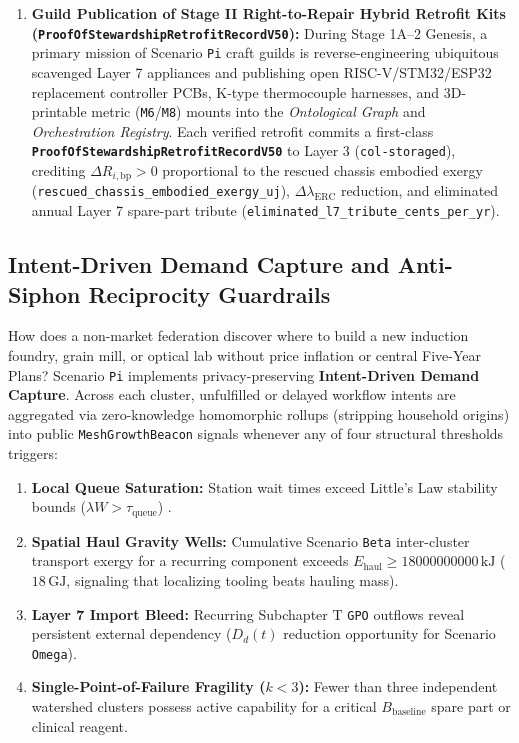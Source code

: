 \begin{enumerate}
\begin{equation}
\begin{aligned}
    \end{aligned}
        \label{eq:pi-antifarm}
    \end{equation}
    \item \textbf{Guild Publication of Stage II Right-to-Repair Hybrid Retrofit Kits (\texttt{ProofOfStewardshipRetrofitRecordV50}):}
    During Stage 1A--2 Genesis, a primary mission of Scenario \texttt{Pi} craft guilds is reverse-engineering
    ubiquitous scavenged Layer 7 appliances and publishing open RISC-V/STM32/ESP32 replacement controller
    PCBs, K-type thermocouple harnesses, and 3D-printable metric (\texttt{M6}/\texttt{M8}) mounts into the
    \textit{Ontological Graph} and \textit{Orchestration Registry}. Each verified retrofit commits a
    first-class \textbf{\texttt{ProofOfStewardshipRetrofitRecordV50}} to Layer 3 (\texttt{col-storaged}),
    crediting $\Delta R_{i,\mathrm{bp}} > 0$ proportional to the rescued chassis embodied exergy
    (\texttt{rescued\_chassis\_embodied\_exergy\_uj}), $\Delta\lambda_{\mathrm{ERC}}$ reduction, and
    eliminated annual Layer 7 spare-part tribute (\texttt{eliminated\_l7\_tribute\_cents\_per\_yr}).
\end{enumerate}

\subsection{Intent-Driven Demand Capture and Anti-Siphon Reciprocity Guardrails}

How does a non-market federation discover where to build a new induction foundry, grain mill, or optical
lab without price inflation or central Five-Year Plans? Scenario \texttt{Pi} implements privacy-preserving
\textbf{Intent-Driven Demand Capture}. Across each cluster, unfulfilled or delayed workflow intents are
aggregated via zero-knowledge homomorphic rollups (stripping household origins) into public
\texttt{MeshGrowthBeacon} signals whenever any of four structural thresholds triggers:
\begin{enumerate}
    \item \textbf{Local Queue Saturation:} Station wait times exceed Little's Law stability bounds
    ($\lambda W > \tau_{\mathrm{queue}}$) \parencite{little1961proof}.
    \item \textbf{Spatial Haul Gravity Wells:} Cumulative Scenario \texttt{Beta} inter-cluster transport
    exergy for a recurring component exceeds $E_{\mathrm{haul}} \ge 18000000000\,\mathrm{kJ}$ ($18\,\mathrm{GJ}$,
    signaling that localizing tooling beats hauling mass).
    \item \textbf{Layer 7 Import Bleed:} Recurring Subchapter T \texttt{GPO} outflows reveal persistent
    external dependency ($D_d(t)$ reduction opportunity for Scenario \texttt{Omega}).
    \item \textbf{Single-Point-of-Failure Fragility ($k < 3$):} Fewer than three independent watershed
    clusters possess active capability for a critical $B_{\mathrm{baseline}}$ spare part or clinical reagent.
\end{enumerate}

